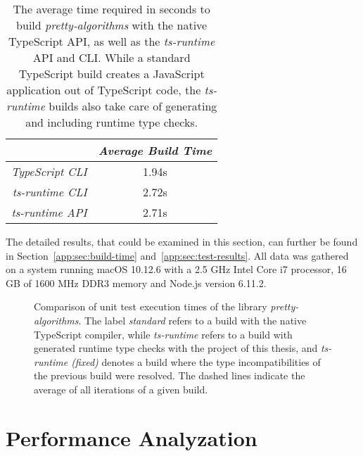 \begin{table}
\caption{The average time required in seconds to build \emph{pretty-algorithms} with the native TypeScript API, as well as the \emph{ts-runtime} API and CLI. While a standard TypeScript build creates a JavaScript application out of TypeScript code, the \emph{ts-runtime} builds also take care of generating and including runtime type checks.}
\label{tab:build-time}
\centering
\setlength{\tabcolsep}{5mm}
\def\arraystretch{1.25}
\small
\begin{tabular}{|r||c|}
    \hline
    & \emph{Average Build Time} \\
    \hline
    \hline
    \emph{TypeScript CLI} & 1.94s \\
    \hline
    \emph{ts-runtime CLI} & 2.72s \\
    \hline
    \emph{ts-runtime API} & 2.71s \\
    \hline
  \end{tabular}
\end{table}
The detailed results, that could be examined in this section, can further be found in Section~\ref{app:sec:build-time} and~\ref{app:sec:test-results}. All data was gathered on a system running macOS 10.12.6 with a 2.5 GHz Intel Core i7 processor, 16 GB of 1600 MHz DDR3 memory and Node.js version 6.11.2.
\begin{figure}
\centering

\caption{Comparison of unit test execution times of the library \emph{pretty-algorithms}. The label \emph{standard} refers to a build with the native TypeScript compiler, while \emph{ts-runtime} refers to a build with generated runtime type checks with the project of this thesis, and \emph{ts-runtime (fixed)} denotes a build where the type incompatibilities of the previous build were resolved. The dashed lines indicate the average of all iterations of a given build.}
\label{fig:operational-test}
\end{figure}

\section{Performance Analyzation}
\label{sec:performance-analyzation}


